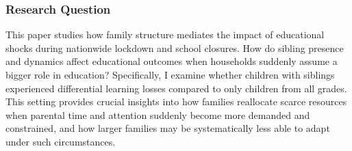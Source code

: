 
\subsubsection{Research Question}
This paper studies how family structure mediates the impact of educational shocks during nationwide lockdown and school closures. How do sibling presence and dynamics affect educational outcomes when households suddenly assume a bigger role in education? Specifically, I examine whether children with siblings experienced differential learning losses compared to only children from all grades. This setting provides crucial insights into how families reallocate scarce resources when parental time and attention suddenly become more demanded and constrained, and how larger families may be systematically less able to adapt under such circumstances.



